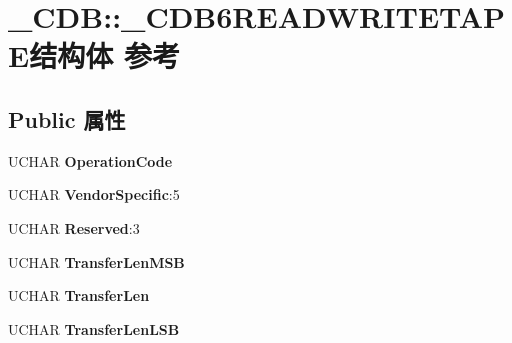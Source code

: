 \hypertarget{struct___c_d_b_1_1___c_d_b6_r_e_a_d_w_r_i_t_e_t_a_p_e}{}\section{\+\_\+\+C\+DB\+:\+:\+\_\+\+C\+D\+B6\+R\+E\+A\+D\+W\+R\+I\+T\+E\+T\+A\+P\+E结构体 参考}
\label{struct___c_d_b_1_1___c_d_b6_r_e_a_d_w_r_i_t_e_t_a_p_e}
\subsection*{Public 属性}
\begin{DoxyCompactItemize}
\item 
\mbox{\label{struct___c_d_b_1_1___c_d_b6_r_e_a_d_w_r_i_t_e_t_a_p_e_ae45955ab804b53de9a0fae31ce215b1b}} 
U\+C\+H\+AR {\bfseries Operation\+Code}
\item 
\mbox{\label{struct___c_d_b_1_1___c_d_b6_r_e_a_d_w_r_i_t_e_t_a_p_e_a2f7f5a8c31d6edb599dbbc554eb771d0}} 
U\+C\+H\+AR {\bfseries Vendor\+Specific}\+:5
\item 
\mbox{\label{struct___c_d_b_1_1___c_d_b6_r_e_a_d_w_r_i_t_e_t_a_p_e_a6bd4a889abf07d4cf0e9e1a69dde5faa}} 
U\+C\+H\+AR {\bfseries Reserved}\+:3
\item 
\mbox{\label{struct___c_d_b_1_1___c_d_b6_r_e_a_d_w_r_i_t_e_t_a_p_e_aa616d761ddfbdf296fdbf18347efae96}} 
U\+C\+H\+AR {\bfseries Transfer\+Len\+M\+SB}
\item 
\mbox{\label{struct___c_d_b_1_1___c_d_b6_r_e_a_d_w_r_i_t_e_t_a_p_e_add7049c837352e508da19e29a0225cb1}} 
U\+C\+H\+AR {\bfseries Transfer\+Len}
\item 
\mbox{\label{struct___c_d_b_1_1___c_d_b6_r_e_a_d_w_r_i_t_e_t_a_p_e_a6b8a2fd2a2571fc76ca9e312bea92dc3}} 
U\+C\+H\+AR {\bfseries Transfer\+Len\+L\+SB}
\item 

\end{DoxyCompactItemize}
